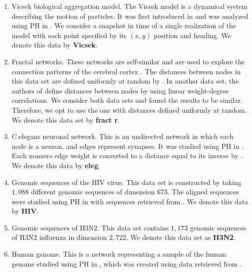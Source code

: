 \begin{enumerate}
    \item Vicsek biological aggregation model. The Vicsek model is a dynamical system describing the motion of particles. %
    It was first introduced in \cite{vicsek} and was analyzed using PH in \cite{TZH15}. We consider a snapshot in time of a single realization of the model %
    with each point specified by its $(x,y)$ position and heading. We denote this data by \textbf{Vicsek}. 
    \item Fractal networks. These networks are self-similar and are used to explore the connection patterns of the cerebral cortex \cite{fractr}. The distances between nodes in this data set are defined uniformly at random by \cite{roadmap2017}. In another data set, the authors of \cite{roadmap2017} define distances between nodes by using linear weight-degree correlations. We consider both data sets and found the results to be similar. Therefore, we opt to use the one with distances defined uniformly at random. %
    We denote this data set by \textbf{fract r}.  
    \item C.elegans neuronal network. This is an undirected network in which each node is a neuron, and edges represent synapses. It was studied using PH in \cite{celegans}. Each nonzero edge weight is converted to a distance equal to its inverse by \cite{roadmap2017}. %
    We denote this data by \textbf{eleg}.
    \item Genomic sequences of the HIV virus. This data set is constructed by taking $1,088$ different genomic sequences of dimension $673$. The aligned sequences were studied using PH in \cite{hiv} with sequences retrieved from \cite{HIVdata}. We denote this data by \textbf{HIV}. 
    \item Genomic sequences of H3N2. This data set contains $1,173$ genomic sequences of H3N2 influenza in dimension $2,722$. We denote this data set as \textbf{H3N2}. 
    \item Human genome. This is a network representing a sample of the human genome studied using PH in \cite{celegans}, which was created using data retrieved from \cite{genome}. %

\end{enumerate}
